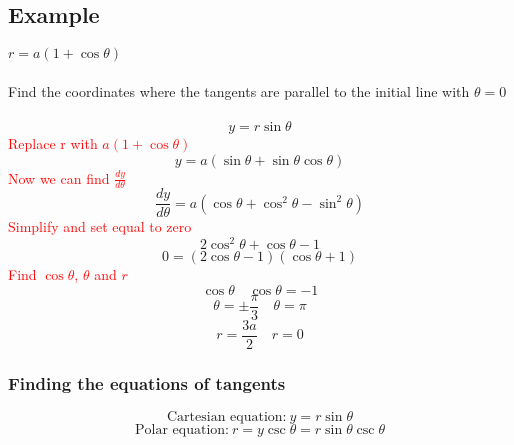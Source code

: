 \documentclass{article}
\begin{document}
\subsection{Example}
$r=a(1+\cos\theta)$\\
\\
Find the coordinates where the tangents are parallel to the initial line with $\theta=0$\\
\\
$$y=r\sin\theta$$
\textcolor{red}{Replace r with $a(1+\cos\theta)$}
$$y=a(\sin\theta+\sin\theta\cos\theta)$$
\textcolor{red}{Now we can find $\frac{dy}{d\theta}$}
$$\frac{dy}{d\theta}=a(\cos\theta+\cos^2\theta-\sin^2\theta)$$
\textcolor{red}{Simplify and set equal to zero}
$$2\cos^2\theta+\cos\theta-1$$
$$0=(2\cos\theta-1)(\cos\theta+1)$$
\textcolor{red}{Find $\cos\theta$, $\theta$ and $r$}
$$\cos\theta \quad \cos\theta=-1$$
$$\theta=\pm\frac{\pi}{3} \quad \theta=\pi$$
$$r=\frac{3a}{2} \quad r=0$$
\subsubsection{Finding the equations of tangents}
$$\textrm{Cartesian equation:} \ y=r\sin\theta$$
$$\textrm{Polar equation:} \ r=y\csc\theta=r\sin\theta\csc\theta$$
\end{document}
